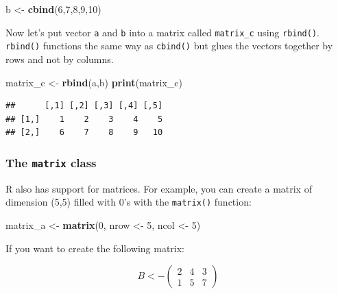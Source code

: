 \documentclass[]{gitbook}
\newenvironment{Shaded}{\begin{snugshade}}{\end{snugshade}}
\newcommand{\DecValTok}[1]{\textcolor[rgb]{0.00,0.00,0.81}{#1}}
\newcommand{\KeywordTok}[1]{\textcolor[rgb]{0.13,0.29,0.53}{\textbf{#1}}}
\newcommand{\NormalTok}[1]{#1}
\newcommand{\StringTok}[1]{\textcolor[rgb]{0.31,0.60,0.02}{#1}}
\theoremstyle{definition}
\theoremstyle{definition}
\theoremstyle{definition}
\theoremstyle{remark}
\begin{document}
\begin{Shaded}
\begin{Highlighting}[]
\NormalTok{b <-}\StringTok{ }\KeywordTok{cbind}\NormalTok{(}\DecValTok{6}\NormalTok{,}\DecValTok{7}\NormalTok{,}\DecValTok{8}\NormalTok{,}\DecValTok{9}\NormalTok{,}\DecValTok{10}\NormalTok{)}
\end{Highlighting}
\end{Shaded}

Now let's put vector \texttt{a} and \texttt{b} into a matrix called
\texttt{matrix\_c} using \texttt{rbind()}. \texttt{rbind()} functions
the same way as \texttt{cbind()} but glues the vectors together by rows
and not by columns.

\begin{Shaded}
\begin{Highlighting}[]
\NormalTok{matrix_c <-}\StringTok{ }\KeywordTok{rbind}\NormalTok{(a,b)}
\KeywordTok{print}\NormalTok{(matrix_c)}
\end{Highlighting}
\end{Shaded}

\begin{verbatim}
##      [,1] [,2] [,3] [,4] [,5]
## [1,]    1    2    3    4    5
## [2,]    6    7    8    9   10
\end{verbatim}

\hypertarget{the-matrix-class}{%
\subsubsection{\texorpdfstring{The \texttt{matrix}
class}{The matrix class}}\label{the-matrix-class}}

R also has support for matrices. For example, you can create a matrix of
dimension (5,5) filled with 0's with the \texttt{matrix()} function:

\begin{Shaded}
\begin{Highlighting}[]
\NormalTok{matrix_a <-}\StringTok{ }\KeywordTok{matrix}\NormalTok{(}\DecValTok{0}\NormalTok{, nrow <-}\StringTok{ }\DecValTok{5}\NormalTok{, ncol <-}\StringTok{ }\DecValTok{5}\NormalTok{)}
\end{Highlighting}
\end{Shaded}

If you want to create the following matrix:

\[
B <- \left(
\begin{array}{ccc}
 2 & 4 & 3 \\
 1 & 5 & 7
\end{array} \right)
\]
\end{document}
